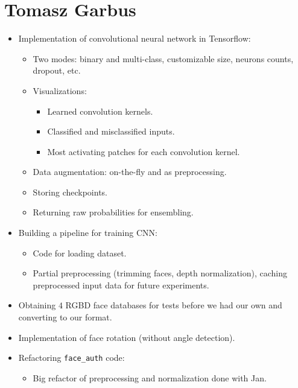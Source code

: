     \section{Tomasz Garbus}
        \begin{itemize}
            \item Implementation of convolutional neural network in Tensorflow:
            \begin{itemize}
                \item Two modes: binary and multi-class, customizable size, neurons
                      counts, dropout, etc.
                \item Visualizations:
                    \begin{itemize}
                        \item Learned convolution kernels.
                        \item Classified and misclassified inputs.
                        \item Most activating patches for each convolution kernel.
                    \end{itemize}
                \item Data augmentation: on-the-fly and as preprocessing.
                \item Storing checkpoints.
                \item Returning raw probabilities for ensembling.
            \end{itemize}
            \item Building a pipeline for training CNN:
            \begin{itemize}
                \item Code for loading dataset.
                \item Partial preprocessing (trimming faces, depth normalization),
                      caching preprocessed input data for future experiments.
            \end{itemize}
            \item Obtaining $4$ RGBD face databases for tests before we had our own and
                  converting to our format.
            \item Implementation of face rotation (without angle detection).
            \item Refactoring \texttt{face\_auth} code:
            \begin{itemize}
                \item Big refactor of preprocessing and normalization done with Jan.

\end{itemize}
\end{itemize}
